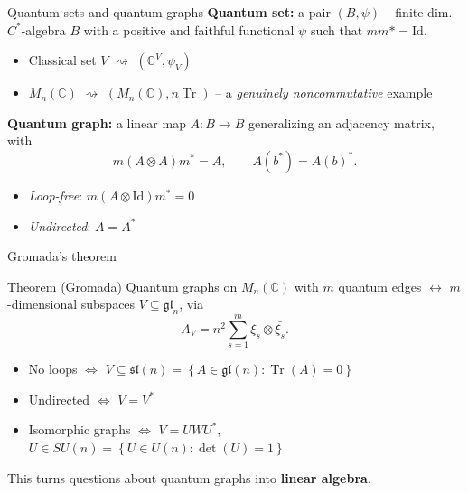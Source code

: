 \documentclass[aspectratio=169]{beamer}
\begin{document}
\begin{frame}{Quantum sets and quantum graphs}
    \textbf{Quantum set:} a pair $(B, \psi)$ -- finite-dim.\ $C^*$-algebra $B$
    with a positive and faithful functional $\psi$ such that \( mm* =
    \mathrm{Id} \).
    \begin{itemize}
        \item Classical set $V$ $\rightsquigarrow$ $(\mathbb{C}^V, \psi_V)$
        \item $M_n(\mathbb{C})$ $\rightsquigarrow$ $(M_n(\mathbb{C}),
            n\operatorname{Tr})$ -- a
            \emph{genuinely noncommutative} example
    \end{itemize}
    \vspace{0.5em}
    \textbf{Quantum graph:} a linear map $A \colon B \to B$ generalizing an
    adjacency matrix, with
    \[
        m(A\otimes A)m^* = A, \qquad A(b^*) = A(b)^*.
    \]
    \begin{itemize}
        \item \emph{Loop-free}: $m(A \otimes \mathrm{Id})m^* = 0$
        \item \emph{Undirected}: $A = A^*$
    \end{itemize}
\end{frame}

\begin{frame}{Gromada's theorem}
    \begin{block}{Theorem (Gromada)}
        Quantum graphs on $M_n(\mathbb{C})$ with $m$ quantum edges
        $\longleftrightarrow$
        $m$-dimensional subspaces $V \subseteq \mathfrak{gl}_n$, via
        \[
            A_V = n^2 \sum_{s=1}^m \xi_s \otimes \bar{\xi_s}.
        \]
        \begin{itemize}
            \item No loops $\iff$ $V \subseteq \mathfrak{sl}(n) =
                \left\{ A \in \mathfrak{gl}(n) : \operatorname{Tr}(A)
                = 0 \right\}$
            \item Undirected $\iff$ $V = V^*$
            \item Isomorphic graphs $\iff$ $V = UWU^*$, $U \in SU(n)
                = \left\{ U \in U(n) : \det(U) = 1 \right\}$
        \end{itemize}
    \end{block}
    \vspace{0.5em}
    This turns questions about quantum graphs into \textbf{linear algebra}.
\end{frame}
\end{document}
